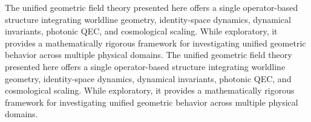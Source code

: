 \documentclass[aip,jmp,reprint,onecolumn,nofootinbib]{revtex4-2}
\begin{document}
The unified geometric field theory presented here offers a single operator-based structure 
integrating worldline geometry, identity-space dynamics, dynamical invariants, photonic 
QEC, and cosmological scaling. While exploratory, it provides a mathematically rigorous 
framework for investigating unified geometric behavior across multiple physical domains.
The unified geometric field theory presented here offers a single operator-based structure 
integrating worldline geometry, identity-space dynamics, dynamical invariants, photonic 
QEC, and cosmological scaling. While exploratory, it provides a mathematically rigorous 
framework for investigating unified geometric behavior across multiple physical domains.



\end{document}
